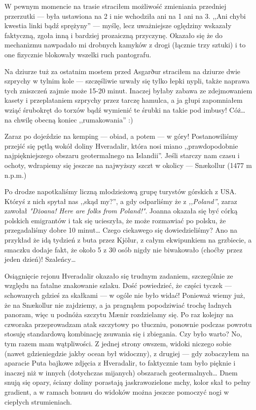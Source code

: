 W pewnym momencie na trasie straciłem możliwość zmieniania przedniej przerzutki --- była ustawiona na 2 i nie wchodziła ani na 1 ani na 3. ,,Ani chybi kwestia linki bądź sprężyny'' --- myślę, lecz uważniejsze oględziny wskazały faktyczną, zgoła inną i bardziej prozaiczną przyczynę. Okazało się że do mechanizmu nawpadało mi drobnych kamyków z drogi (łącznie trzy sztuki) i to one fizycznie blokowały wszelki ruch pantografu.

Na dziurze tuż za ostatnim mostem przed Asgarður straciłem na dziurze dwie szprychy w tylnim kole --- szczęśliwie urwały się tylko łepki nypli, także naprawa tych zniszczeń zajmie może 15-20 minut. Inaczej byłaby zabawa ze zdejmowaniem kasety i przeplataniem szprychy przez tarczę hamulca, a ja głupi zapomniałem wziąć śrubokręt do torxów bądź wymienić te śrubki na takie pod imbusy! Cóż… na chwilę obecną koniec ,,rumakowania'' :)


Zaraz po dojeździe na kemping --- obiad, a potem --- w góry! Postanowiliśmy przejść się pętlą wokół doliny Hveradalir, która nosi miano ,,prawdopodobnie najpiękniejszego obszaru geotermalnego na Islandii''. Jeśli starczy nam czasu i ochoty, wdrapiemy się jeszcze na najwyższy szczt w okolicy --- Snækollur (1477 m n.p.m.)

Po drodze napotkaliśmy liczną młodzieżową grupę turystów górskich z USA. Któryś z nich spytał nas ,,skąd my?'', a gdy odparliśmy że z \emph{,,Poland''}, zaraz zawołał \emph{"Dżoana! Here are folks from Poland!"}. Joanna okazała się być córką polskich emigrantów i tak się ucieszyła, że może rozmawiać po polsku, że przegadaliśmy dobre 10 minut… Czego ciekawego się dowiedzieliśmy? Ano na przykład że idą tydzień z buta przez Kjölur, z całym ekwipunkiem na grzbiecie, a smaczku dodaje fakt, że około 5 z 30 osób nigdy nie biwakowało (choćby przez jeden dzień)! Szaleńcy…


Osiągnięcie rejonu Hveradalir okazało się trudnym zadaniem, szczególnie ze względu na fatalne znakowanie szlaku. Dość powiedzieć, że części tyczek --- schowanych gdzieś za skałkami --- w ogóle nie było widać! Ponieważ wiemy już, że na Snækollur nie zajdziemy, a ja pragnąłem popodziwiać trochę ładnych panoram, więc u podnóża szczytu Mænir rozdzielamy się. Po raz kolejny na czworaka przeprowadzam atak szczytowy po tłuczniu, ponownie podczas powrotu stosuję standardową kombinację zsuwania się i zbiegania. Czy było warto? No, tym razem mam wątpliwości. Z jednej strony owszem, widoki niczego sobie (nawet gdzieniegdzie jakby ocean był widoczny), z drugiej --- gdy zobaczyłem na aparacie Puta bajkowe zdjęcia z Hveradalir, to faktycznie tam było pięknie i inaczej niż w innych (dotychczas mijanych) obszarach geotermalnych… Dnem snują się opary, ściany doliny porastają jaskrawozielone mchy, kolor skał to pełny gradient, a w ramach bonusu do widoków można jeszcze pomoczyć nogi w ciepłych strumieniach.

